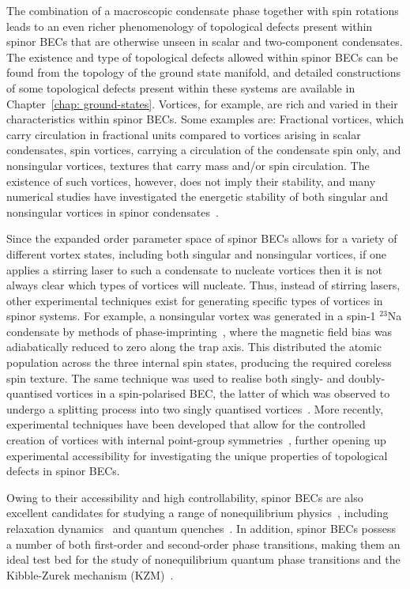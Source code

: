 The combination of a macroscopic condensate phase together with spin rotations
leads to an even richer phenomenology of topological defects present within
spinor BECs that are otherwise unseen in scalar and two-component condensates.
The existence and type of topological defects allowed within spinor BECs can be
found from the topology of the ground state manifold, and detailed constructions
of some topological defects present within these systems
are available in Chapter~\ref{chap: ground-states}.
Vortices, for example, are rich and varied in their characteristics within
spinor BECs.
Some examples are: Fractional vortices, which carry circulation in fractional
units compared to vortices arising in scalar condensates, spin vortices,
carrying a circulation of the condensate spin only, and nonsingular vortices,
textures that carry mass and/or spin circulation.
The existence of such vortices, however, does not imply their stability, and
many numerical studies have investigated the energetic stability of both
singular and nonsingular vortices in spinor condensates~\cite{Isoshima2001,
Mizushima2002, Mizushima2002a,Takahashi2009, Lovegrove2012, Lovegrove2014,
Lovegrove2016}.

Since the expanded order parameter space of spinor BECs allows for a variety of
different vortex states, including both singular and nonsingular vortices, if
one applies a stirring laser to such a condensate to nucleate vortices then it
is not always clear which types of vortices will nucleate.
Thus, instead of stirring lasers, other experimental techniques exist for
generating specific types of vortices in spinor systems.
For example, a nonsingular vortex was generated in a spin-1 \(^{23}\)Na
condensate by methods of phase-imprinting~\cite{Leanhardt2003}, where the
magnetic field bias was adiabatically reduced to zero along the trap axis.
This distributed the atomic population across the three internal spin states,
producing the required coreless spin texture.
The same technique was used to realise both singly- and doubly-quantised
vortices in a spin-polarised BEC, the latter of which was observed to undergo a
splitting process into two singly quantised vortices~\cite{Leanhardt2002,
Shin2004}.
More recently, experimental techniques have been developed that allow for the
controlled creation of vortices with internal point-group
symmetries~\cite{Xiao2022}, further opening up experimental accessibility for
investigating the unique properties of topological defects in spinor BECs.

Owing to their accessibility and high controllability, spinor BECs are also
excellent candidates for studying a range of nonequilibrium
physics~\cite{Schmaljohann2004}, including
relaxation dynamics~\cite{Gring2012, Reeves2022} and quantum
quenches~\cite{Sadler2006,Barnett2011,Navon2015,Symes2017,Kang2017,Prufer2018,
Schmied2019,Liu2020}.
In addition, spinor BECs possess a number of both first-order and second-order
phase transitions, making them an ideal test bed for the study of nonequilibrium
quantum phase transitions and the Kibble-Zurek mechanism (KZM)~\cite{Sadler2006,
Damski2006,Damski2007, Lamacraft2007,Saito2007, Saito2007a,Vengalattore2008,
Swislocki2013, Witkowska2013, Anquez2016,Williamson2016,Kang2017}.

